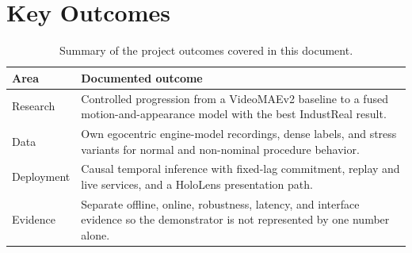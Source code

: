 \section{Key Outcomes}

\begin{table}[H]
\centering
\small
\begin{tabularx}{\textwidth}{@{}p{}X@{}}
\toprule
\textbf{Area} & \textbf{Documented outcome} \\
\midrule
Research & Controlled progression from a VideoMAEv2 baseline to a fused
motion-and-appearance model with the best IndustReal result. \\
Data & Own egocentric engine-model recordings, dense labels, and stress
variants for normal and non-nominal procedure behavior. \\
Deployment & Causal temporal inference with fixed-lag commitment, replay and
live services, and a HoloLens presentation path. \\
Evidence & Separate offline, online, robustness, latency, and interface
evidence so the demonstrator is not represented by one number alone. \\
\bottomrule
\end{tabularx}
\caption{Summary of the project outcomes covered in this document.}
\label{tab:key-outcomes}
\end{table}
